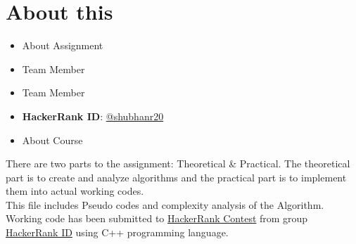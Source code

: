 
\section{About this}\label{About}

\begin{itemize}

\item About Assignment \\

\item Team Member  \\ 

\item Team Member  \\ 

\item \textbf{HackerRank ID}: \href{https://www.hackerrank.com/shubhanr20}{@shubhanr20}

\item About Course \\

\end{itemize}
\justifying
There are two parts to the assignment: Theoretical \& Practical. The theoretical part is to create and analyze algorithms and the practical part is to implement them into actual working codes. \vspace{5pt} \\
This file includes Pseudo codes and complexity analysis of the Algorithm. Working code has been submitted to \href{https://www.hackerrank.com/eso207a1}{HackerRank Contest} from group \href{https://www.hackerrank.com/shubhanr20}{HackerRank ID} using C++ programming language.
